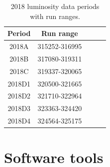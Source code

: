 


\begin{table}
  \begin{center}
    \begin{tabular}{ccccc}  
    \textbf{Period}   & \textbf{Run range} \\ \hline
     2018A      &        315252-316995         \\ 
     2018B      &        317080-319311         \\ 
     2018C      &        319337-320065         \\ 
     2018D1     &        320500-321665        \\ 
     2018D2     &        321710-322964         \\ 
     2018D3     &        323363-324420         \\ 
     2018D4     &        324564-325175        \\ 
      \end{tabular}
    \caption{2018 luminosity data periods with run ranges.}
    \label{tab:period run ranges}
  \end{center}
\end{table}


\section{Software tools}

 
